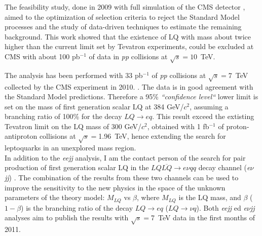 \documentclass[10pt, a4paper]{article}
\begin{document}
The feasibility study, done in 2009 with full simulation of the CMS detector \cite{AN-2008-070,EXO-08-010},
aimed to the optimization of selection criteria to reject the Standard Model processes and the study of 
data-driven techniques to estimate the remaining background. This work showed that the existence of LQ with mass
about twice higher than the current limit set by Tevatron experiments, could be excluded at CMS with about 
100 pb$^{-1}$ of data in {\it pp} collisions at $\sqrt{s}=10$~TeV. 

The analysis has been performed with 33 pb$^{-1}$ of {\it pp} collisions at $\sqrt{s}=7$~TeV collected by the CMS experiment in 2010.
\cite{Khachatryan:2010mp,EXO-10-005,AN-2010-230}. The data is in good agreement with the Standard Model predictions. Therefore 
a 95\% {\it ``confidence level``} lower limit is set on the mass of first generation scalar LQ at 384 GeV/$c^2$, assuming a 
branching ratio of 100\% for the decay $LQ\rightarrow eq$. This result exceed the extisting Tevatron limit on the LQ mass 
of 300 GeV/$c^2$, obtained with 1 fb$^{-1}$ of proton-antiproton collisions at $\sqrt{s}=$1.96~TeV, hence extending the search for 
leptoquarks in an unexplored mass region. \\

In addition to the {\it eejj} analysis, I am the contact person of the search for pair production of first generation scalar LQ
in the $LQ\overline{LQ} \rightarrow e\nu qq$ decay channel ({\it e$\nu$jj}) \cite{AN-2010-361}.
The combination of the results from these two channels can be used to improve the sensitivity to the new physics in 
the space of the unknown parameters of the theory model: $M_{LQ}$ vs $\beta$, where $M_{LQ}$ is the LQ mass, and 
$\beta$ ($1-\beta$) is the branching ratio of the decay $LQ\rightarrow eq$ ($LQ\rightarrow \nu q$). Both 
{\it eejj} ed {\it e$\nu$jj} analyses aim to publish the results with $\sqrt{s}=$7~TeV data in the first months of 2011.

\clearpage

\end{document}
